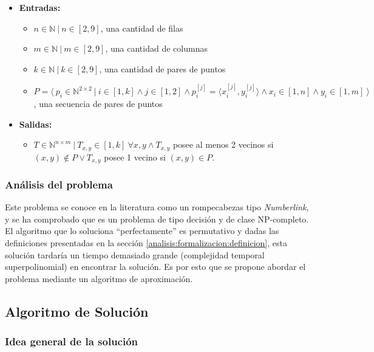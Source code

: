 \documentclass[letter,12pt]{article}
\begin{document}
\begin{itemize}
    \item \textbf{Entradas:}
    \begin{itemize}
        \item $n \in \mathbb{N} ~ | ~ n \in [2,9]$, una cantidad de filas
        \item $m \in \mathbb{N} ~ | ~ m \in [2,9]$, una cantidad de columnas
        \item $k \in \mathbb{N} ~ | ~ k \in [2,9]$, una cantidad de pares de puntos
        \item $P = \langle ~ p_i \in \mathbb{N}^{2 \times 2} ~ | ~ i \in [1, k] \land j \in [1, 2] \land p_i^{[j]} = \langle x_i^{[j]}, y_i^{[j]} \rangle \land x_i \in [1,n] \land y_i \in [1,m] ~ \rangle$, una secuencia de pares de puntos
    \end{itemize}
    \item \textbf{Salidas:}
    \begin{itemize}
        \item $T \in \mathbb{N}^{n \times m} ~ | ~ T_{x,y} \in [1, k] ~ \forall x,y \land T_{x,y}$ posee al menos 2 vecinos si $(x,y) \notin P \lor T_{x,y}$ posee 1 vecino si $(x,y) \in P$.
    \end{itemize}
\end{itemize}

\subsubsection{Análisis del problema} \label{analisis:formalizacion:analisis}

Este problema se conoce en la literatura como un rompecabezas tipo \textit{Numberlink}, y se ha comprobado que es un problema de tipo decisión y de clase NP-completo. El algoritmo que lo soluciona ``perfectamente'' es permutativo y dadas las definiciones presentadas en la sección \ref{analisis:formalizacion:definicion}, esta solución tardaría un tiempo demasiado grande (complejidad temporal superpolinomial) en encontrar la solución. Es por esto que se propone abordar el problema mediante un algoritmo de aproximación. \par

\subsection{Algoritmo de Solución} \label{analisis:algoritmo}

\subsubsection{Idea general de la solución} \label{analisis:algoritmo:idea}
\end{document}
